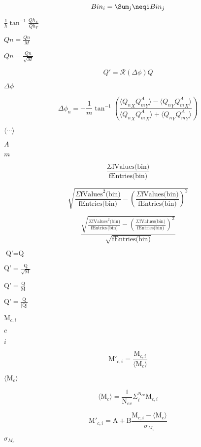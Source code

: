 \documentclass{article}
\begin{document}
\[ Bin_i=\Sum_j\neqi Bin_j \]
\pagebreak

$\frac{1}{h}\tan^{-1}{\frac{Qh_X}{Qh_Y}}$
\pagebreak

$ Qn = \frac{Qn}{M} $
\pagebreak

$ Qn = \frac{Qn}{\sqrt{M}} $
\pagebreak

\[ Q' = \mathcal{R}(\Delta \phi) Q \]
\pagebreak

$ \Delta \phi $
\pagebreak

\[ \Delta \phi_n = - \frac{1}{m} \tan^{-1} \left(\frac{\langle{Q_n}_X{Q^A_m}_Y\rangle - \langle{Q_n}_Y{Q^A_m}_X\rangle} {\langle{Q_n}_X{Q^A_m}_X\rangle + \langle{Q_n}_Y{Q^A_m}_Y\rangle}\right) \]
\pagebreak

$ \langle \cdots \rangle $
\pagebreak

$ A $
\pagebreak

$ m $
\pagebreak

\[ \frac{\Sigma \mbox{fValues(bin)}}{\mbox{fEntries(bin)}} \]
\pagebreak

\[ \sqrt{\frac{\Sigma \mbox{fValues}^2\mbox{(bin)}}{\mbox{fEntries(bin)}} - \left(\frac{\Sigma \mbox{fValues(bin)}}{\mbox{fEntries(bin)}}\right)^2} \]
\pagebreak

\[ \frac{\sqrt{\frac{\Sigma \mbox{fValues}^2\mbox{(bin)}}{\mbox{fEntries(bin)}} - \left(\frac{\Sigma \mbox{fValues(bin)}}{\mbox{fEntries(bin)}}\right)^2}} {\sqrt{\mbox{fEntries(bin)}}} \]
\pagebreak

$ \mbox{Q'} = \mbox{Q}$
\pagebreak

$ \mbox{Q'} = \frac{\mbox{Q}}{\sqrt{\mbox{M}}} $
\pagebreak

$ \mbox{Q'} = \frac{\mbox{Q}}{\mbox{M}} $
\pagebreak

$ \mbox{Q'} = \frac{\mbox{Q}}{|\mbox{Q}|} $
\pagebreak

$ \mbox{M}_{c,i} $
\pagebreak

$ c $
\pagebreak

$ i $
\pagebreak

\[ \mbox{M}'_{c,i} = \frac{\mbox{M}_{c,i}}{\langle\mbox{M}_{c}\rangle} \]
\pagebreak

$\langle\mbox{M}_{c}\rangle$
\pagebreak

\[ \langle\mbox{M}_{c}\rangle = \frac{1}{\mbox{N}_{ev}} \Sigma_{i}^{\mbox{N}_{ev}} \mbox{M}_{c,i} \]
\pagebreak

\[ \mbox{M}'_{c,i} = \mbox{A} + \mbox{B} \frac{\mbox{M}_{c,i} - \langle\mbox{M}_{c}\rangle} {\sigma_{{M}_{c}}} \]
\pagebreak

$\sigma_{{M}_{c}}$
\pagebreak
\end{document}
